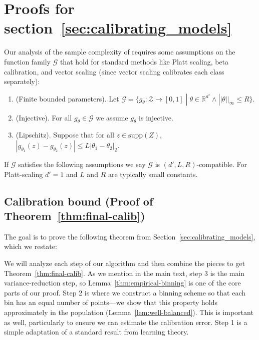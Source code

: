 \newpage
\section{Proofs for section~\ref{sec:calibrating_models}}
\label{sec:calibrating_models_appendix}

\newcommand{\G}[0]{\ensuremath{\mathcal{G}}}

Our analysis of the sample complexity of \ourcal{} requires some assumptions on the function family $\G{}$ that hold for standard methods like Platt scaling, beta calibration, and vector scaling (since vector scaling calibrates each class separately):

\begin{enumerate}
\item (Finite bounded parameters). Let $\G{} = \{ g_{\theta} : \mathcal{Z} \to [0, 1] \; | \; \theta \in \mathbb{R}^{d'} \wedge ||\theta||_{\infty} \leq R \}$.
\item (Injective). For all $g_{\theta} \in \G{}$ we assume $g_{\theta}$ is injective.
\item (Lipschitz). Suppose that for all $z \in \mbox{supp}(Z)$, $|g_{\theta_1}(z) - g_{\theta_2}(z)| \leq L|\theta_1 - \theta_2|_2$.
\end{enumerate}

If $\G{}$ satisfies the following assumptions we say $\G{}$ is $(d', L, R)$-compatible. For Platt-scaling $d' = 1$ and $L$ and $R$ are typically small constants.



\subsection{Calibration bound (Proof of Theorem~\ref{thm:final-calib})}

The goal is to prove the following theorem from Section~\ref{sec:calibrating_models}, which we restate:

\finalCalib*{}


We will analyze each step of our algorithm and then combine the pieces to get Theorem~\ref{thm:final-calib}.
As we mention in the main text, step 3 is the main variance-reduction step, so Lemma~\ref{thm:empirical-binning} is one of the core parts of our proof.
Step 2 is where we construct a binning scheme so that each bin has an equal number of points---we show that this property holds approximately in the population (Lemma~\ref{lem:well-balanced}).
This is important as well, particularly to ensure we can estimate the calibration error.
Step 1 is a simple adaptation of a standard result from learning theory.

